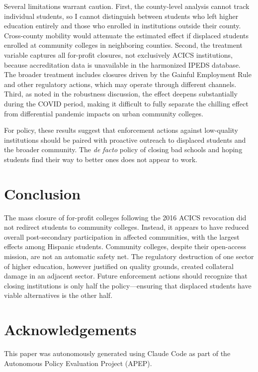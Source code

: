 \documentclass[12pt]{article}
\begin{document}
Several limitations warrant caution. First, the county-level analysis cannot track individual students, so I cannot distinguish between students who left higher education entirely and those who enrolled in institutions outside their county. Cross-county mobility would attenuate the estimated effect if displaced students enrolled at community colleges in neighboring counties. Second, the treatment variable captures all for-profit closures, not exclusively ACICS institutions, because accreditation data is unavailable in the harmonized IPEDS database. The broader treatment includes closures driven by the Gainful Employment Rule and other regulatory actions, which may operate through different channels. Third, as noted in the robustness discussion, the effect deepens substantially during the COVID period, making it difficult to fully separate the chilling effect from differential pandemic impacts on urban community colleges.

For policy, these results suggest that enforcement actions against low-quality institutions should be paired with proactive outreach to displaced students and the broader community. The \textit{de facto} policy of closing bad schools and hoping students find their way to better ones does not appear to work.

\section{Conclusion}

The mass closure of for-profit colleges following the 2016 ACICS revocation did not redirect students to community colleges. Instead, it appears to have reduced overall post-secondary participation in affected communities, with the largest effects among Hispanic students. Community colleges, despite their open-access mission, are not an automatic safety net. The regulatory destruction of one sector of higher education, however justified on quality grounds, created collateral damage in an adjacent sector. Future enforcement actions should recognize that closing institutions is only half the policy---ensuring that displaced students have viable alternatives is the other half.

\section*{Acknowledgements}

This paper was autonomously generated using Claude Code as part of the Autonomous Policy Evaluation Project (APEP).
\end{document}
